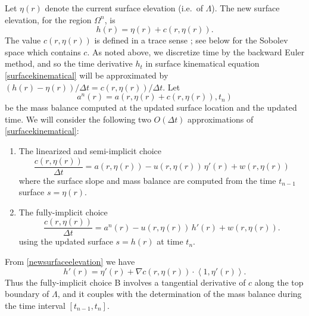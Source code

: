 \documentclass[letterpaper,final,12pt,reqno]{amsart}
\newcommand{\grad}{\nabla}
\begin{document}
Let $\eta(r)$ denote the current surface elevation (i.e.~of $\Lambda$).  The new surface elevation, for the region $\Omega^n$, is
\begin{equation}
h(r) = \eta(r) + c(r,\eta(r)).  \label{newsurfaceelevation}
\end{equation}
The value $c(r,\eta(r))$ is defined in a trace sense \cite{Evans2010}; see below for the Sobolev space which contains $c$.  As noted above, we discretize time by the backward Euler method, and so the time derivative $h_t$ in surface kinematical equation \eqref{surfacekinematical} will be approximated by $(h(r) - \eta(r))/\Delta t = c(r,\eta(r))/\Delta t$.  Let
\begin{equation}
a^n(r) = a\left(r,\eta(r) + c(r,\eta(r)),t_n\right) \label{massbalance}
\end{equation}
be the mass balance computed at the updated surface location and the updated time.  We will consider the following two $O(\Delta t)$ approximations of \eqref{surfacekinematical}:
\renewcommand{\labelenumi}{\Alph{enumi}.}
\begin{enumerate}
\item The linearized and semi-implicit choice
\begin{equation}
\frac{c(r,\eta(r))}{\Delta t} = a(r,\eta(r)) - u(r,\eta(r))\,\eta'(r) + w(r,\eta(r)) \label{surfacesemiimplicit}
\end{equation}
where the surface slope and mass balance are computed from the time $t_{n-1}$ surface $s=\eta(r)$.
\item The fully-implicit choice
\begin{equation}
\frac{c(r,\eta(r))}{\Delta t} = a^n(r) - u(r,\eta(r))\,h'(r) + w(r,\eta(r)). \label{surfaceimplicit}
\end{equation}
using the updated surface $s=h(r)$ at time $t_n$.
\end{enumerate}
From \eqref{newsurfaceelevation} we have
    $$h'(r) = \eta'(r) + \grad c (r,\eta(r)) \cdot \left<1,\eta'(r)\right>.$$
Thus the fully-implicit choice B involves a tangential derivative of $c$ along the top boundary of $\Lambda$, and it couples with the determination of the mass balance during the time interval $[t_{n-1},t_n]$.
\end{document}
